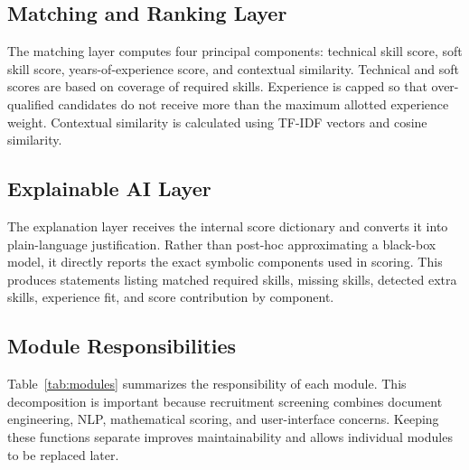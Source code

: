 \documentclass[conference]{IEEEtran}
\begin{document}
\subsection{Matching and Ranking Layer}
The matching layer computes four principal components: technical skill score, soft skill score, years-of-experience score, and contextual similarity. Technical and soft scores are based on coverage of required skills. Experience is capped so that over-qualified candidates do not receive more than the maximum allotted experience weight. Contextual similarity is calculated using TF-IDF vectors and cosine similarity.

\subsection{Explainable AI Layer}
The explanation layer receives the internal score dictionary and converts it into plain-language justification. Rather than post-hoc approximating a black-box model, it directly reports the exact symbolic components used in scoring. This produces statements listing matched required skills, missing skills, detected extra skills, experience fit, and score contribution by component.

\subsection{Module Responsibilities}
Table~\ref{tab:modules} summarizes the responsibility of each module. This decomposition is important because recruitment screening combines document engineering, NLP, mathematical scoring, and user-interface concerns. Keeping these functions separate improves maintainability and allows individual modules to be replaced later.
\end{document}
